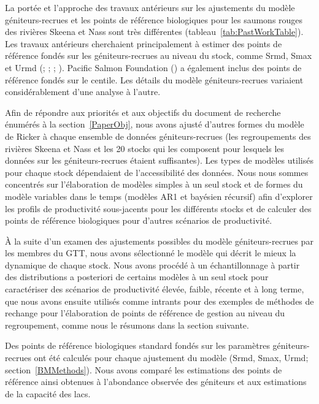 \documentclass[french,11pt]{book}
\begin{document}
La portée et l'approche des travaux antérieurs sur les ajustements du modèle géniteurs-recrues et les points de référence biologiques pour les saumons rouges des rivières Skeena et Nass sont très différentes (tableau~\ref{tab:PastWorkTable}). Les travaux antérieurs cherchaient principalement à estimer des points de référence fondés sur les géniteurs-recrues au niveau du stock, comme Srmd, Smax et Urmd (; ; ; ). Pacific Salmon Foundation () a également inclus des points de référence fondés sur le centile. Les détails du modèle géniteurs-recrues variaient considérablement d'une analyse à l'autre.

Afin de répondre aux priorités et aux objectifs du document de recherche énumérés à la section~\ref{PaperObj}, nous avons ajusté d'autres formes du modèle de Ricker à chaque ensemble de données géniteurs-recrues (les regroupements des rivières Skeena et Nass et les 20 stocks qui les composent pour lesquels les données sur les géniteurs-recrues étaient suffisantes). Les types de modèles utilisés pour chaque stock dépendaient de l'accessibilité des données. Nous nous sommes concentrés sur l'élaboration de modèles simples à un seul stock et de formes du modèle variables dans le temps (modèles AR1 et bayésien récursif) afin d'explorer les profils de productivité sous-jacents pour les différents stocks et de calculer des points de référence biologiques pour d'autres scénarios de productivité.

À la suite d'un examen des ajustements possibles du modèle géniteurs-recrues par les membres du GTT, nous avons sélectionné le modèle qui décrit le mieux la dynamique de chaque stock. Nous avons procédé à un échantillonnage à partir des distributions a posteriori de certains modèles à un seul stock pour caractériser des scénarios de productivité élevée, faible, récente et à long terme, que nous avons ensuite utilisés comme intrants pour des exemples de méthodes de rechange pour l'élaboration de points de référence de gestion au niveau du regroupement, comme nous le résumons dans la section suivante.

Des points de référence biologiques standard fondés sur les paramètres géniteurs-recrues ont été calculés pour chaque ajustement du modèle (Srmd, Smax, Urmd; section~\ref{BMMethods}). Nous avons comparé les estimations des points de référence ainsi obtenues à l'abondance observée des géniteurs et aux estimations de la capacité des lacs.
\end{document}
